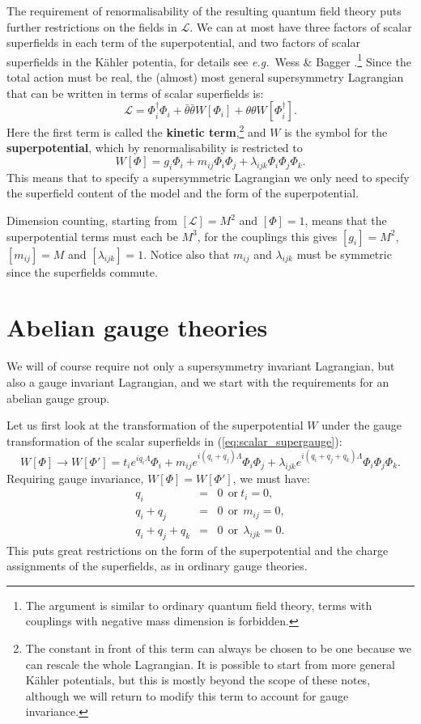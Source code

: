 \documentclass[notes.tex]{subfiles}
\begin{document}
The requirement of renormalisability of the resulting quantum field theory puts further restrictions on the fields in $\mathcal{L}$. We can at most have three factors of scalar superfields in each term of the superpotential, and two factors of scalar superfields in the Kähler potentia,  for details see {\it e.g.}\ Wess \& Bagger \cite{Bagger:1983mv}.\footnote{The argument is similar to ordinary quantum field theory, terms with couplings with negative mass dimension is forbidden.} 
Since the total action must be real, the (almost) most general supersymmetry Lagrangian that can be written in terms of scalar superfields is:
\[\mathcal{L} = \Phi^\dagger_i\Phi_i + \bar{\theta}\bar{\theta}W[\Phi_i] + \theta\theta W[\Phi^\dagger_i].\]
Here the first term is called the {\bf kinetic term},\footnote{The constant in front of this term can always be chosen to be one because we can rescale the whole Lagrangian. It is possible to start from more general Kähler potentials, but this is mostly beyond the scope of these notes, although we will return to modify this term to account for gauge invariance.} and $W$ is the symbol for the {\bf superpotential}, which by renormalisability is restricted to
\begin{equation}
W[\Phi] = g_i \Phi_i + m_{ij}\Phi_i \Phi_j + \lambda_{ijk} \Phi_i \Phi_j \Phi_k.
\end{equation}
This means that to specify a supersymmetric Lagrangian we only need to specify the superfield content of the model and the form of the superpotential. 

Dimension counting, starting from $[\mathcal{L}]=M^2$ and $[\Phi]=1$, means that the superpotential terms must each be $M^3$, for the couplings this gives $[g_i]=M^2$, $[m_{ij}]=M$ and $[\lambda_{ijk}]=1$. Notice also that $m_{ij}$ and $\lambda_{ijk}$ must be symmetric since the superfields commute.



\section[Albanian gauge theories]{Abelian gauge theories}
We will of course require not only a supersymmetry invariant Lagrangian, but also a gauge invariant Lagrangian, and we start with the requirements for an abelian gauge group. 

Let us first look at the transformation of the superpotential $W$ under the gauge transformation of the scalar superfields in (\ref{eq:scalar_supergauge}):
\[W[\Phi] \to W[\Phi'] = t_ie^{iq_i\Lambda }\Phi_i + m_{ij}e^{i(q_i+q_j)\Lambda}\Phi_i\Phi_j + \lambda_{ijk}e^{i(q_i+q_j+q_k)\Lambda}\Phi_i\Phi_j\Phi_k.\]
Requiring gauge invariance, $W[\Phi] = W[\Phi']$, we must have:
\begin{eqnarray}
q_i &=& 0 ~~\text{or}~t_i = 0, \\
q_i+q_j &=& 0 ~~\text{or}~~m_{ij} = 0,  \\
q_i+q_j+q_k &=& 0  ~~\text{or}~~ \lambda_{ijk}=0.
\end{eqnarray}
This puts great restrictions on the form of the superpotential and the charge assignments of the superfields, as in ordinary gauge theories. 
\end{document}
